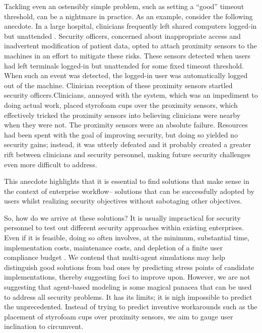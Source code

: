 \documentclass[conference]{IEEEtran}
\begin{document}
{Tackling even an ostensibly simple problem, such as setting a 
``good''  timeout threshold, can be a nightmare in practice. As an 
example, consider the following anecdote. In a large hospital, 
clinicians frequently left shared computers logged-in but 
unattended \cite{kothari2014agent}.  Security officers, concerned 
about inappropriate access and inadvertent modification of patient 
data, opted to attach proximity sensors to the machines in an 
effort to mitigate these risks. These sensors detected when 
users had left terminals logged-in but unattended for some fixed 
timeout threshold. When such an event was detected, the 
logged-in user was automatically logged out of the machine. 
Clinician reception of these proximity sensors startled 
security officers.Clinicians, annoyed with the system, which was an 
impediment to doing actual work, placed styrofoam cups 
over the proximity sensors, which effectively tricked the proximity 
sensors into believing clinicians were nearby when they were not.
The proximity sensors were an absolute failure. Resources had 
been spent with the goal of improving security, but doing so yielded 
no security gains; instead, it was utterly defeated and it probably 
created a greater rift between clinicians and security personnel, 
making future security challenges even more difficult to address.

This anecdote highlights that it is essential to find solutions that 
make sense in the context of enterprise workflow-- solutions that 
can be successfully adopted by users whilst realizing security 
objectives without sabotaging other objectives.

So, how do we arrive at these solutions? It is usually impractical 
for security personnel to test out different security approaches 
within existing enterprises. Even if it is feasible, doing so often 
involves, at the minimum, substantial time, implementation costs, 
maintenance costs, and depletion of a finite user compliance 
budget \cite{beautement2009compliance}. We contend that 
multi-agent simulations may help distinguish good solutions 
from bad ones by predicting stress points of candidate 
implementations, thereby suggesting foci to improve upon. 
However, we are not suggesting that agent-based modeling is 
some magical panacea that can be used to address all security 
problems. It has its limits; it is nigh impossible to predict the 
unprecedented. Instead of trying to predict inventive workarounds 
such as the placement of styrofoam cups over proximity sensors, 
we aim to gauge user inclination to circumvent. 

}
\end{document}
